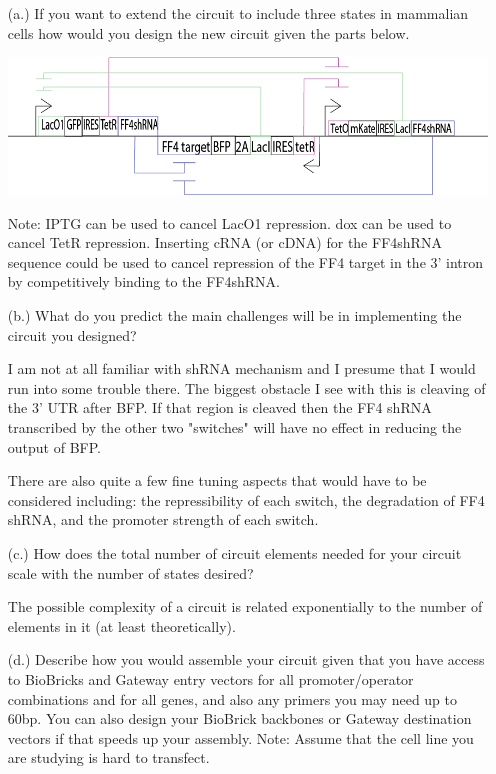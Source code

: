 \documentclass[11pt]{article}
\begin{document}
\begin{itemize}
\item[(a.)] If you want to extend the circuit to include three states in mammalian cells how would you design the new circuit given the parts below. 

{
  \hspace*{-3cm}\includegraphics[scale=.7, trim = 0mm 0mm 7mm 0mm, clip]{"3-way_toggle_vector"}\par
}

Note: IPTG can be used to cancel LacO1 repression. dox can be used to cancel TetR repression. Inserting cRNA (or cDNA) for the FF4shRNA sequence could be used to cancel repression of the FF4 target in the 3' intron by competitively binding to the FF4shRNA. 
\item[(b.)] What do you predict the main challenges will be in implementing the circuit you designed?

I am not at all familiar with shRNA mechanism and I presume that I would run into some trouble there. The biggest obstacle I see with this is cleaving of the 3' UTR after BFP. If that region is cleaved then the FF4 shRNA transcribed by the other two "switches" will have no effect in reducing the output of BFP. 

There are also quite a few fine tuning aspects that would have to be considered including: the repressibility of each switch, the degradation of FF4 shRNA, and the promoter strength of each switch.
\item[(c.)] How does the total number of circuit elements needed for your circuit scale with the number of states desired?

The possible complexity of a circuit is related exponentially to the number of elements in it (at least theoretically). 

\item[(d.)] Describe how you would assemble your circuit given that you have access to BioBricks and Gateway entry vectors for all promoter/operator combinations and for all genes, and also any primers you may need up to 60bp. You can also design your BioBrick backbones or Gateway destination vectors if that speeds up your assembly. Note: Assume that the cell line you are studying is hard to transfect. 


\end{itemize}
\end{document}
